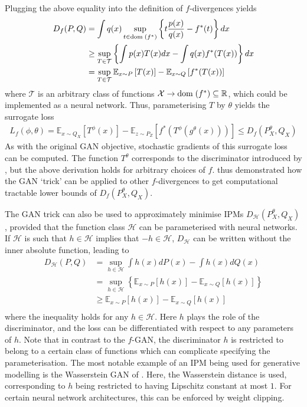 Plugging the above equality into the definition of $f$-divergences yields
%
\begin{align*}
D_f(P, Q) &= \int q(x) \sup_{t \in {\bf{\rm dom}}\;(f^*)} \left\{t \frac{p(x)}{q(x)} - f^*(t) \right\} dx \\
& \geq \sup_{T \in \mathcal{T}} \left\{ \int p(x) T(x) dx - \int q(x) f^*(T(x)) \right\} dx \\
&= \sup_{T \in \mathcal{T}} \mathbb{E}_{x \sim P} \left[ T(x) \right] - \mathbb{E}_{x \sim Q} \left[ f^*(T(x)) \right] 
\end{align*}
%
where $\mathcal{T}$ is an arbitrary class of functions $\mathcal{X} \to {\bf{\rm dom}}\;(f^*) \subseteq \mathbb{R}$, which could be implemented as a neural network.
Thus, parameterising $T$ by $\theta$ yields the surrogate loss
%
\begin{align*}
L_f(\phi, \theta) = \mathbb{E}_{x \sim Q_X} \left[ T^\phi(x) \right] - \mathbb{E}_{z \sim P_Z} \left[ f^*(T^\phi(g^\theta(x))) \right] \leq D_f(P^\theta_X, Q_X)
\end{align*}
%
As with the original GAN objective, stochastic gradients of this surrogate loss can be computed. 
The function $T^\theta$ corresponds to the discriminator introduced by \cite{goodfellow}, but the above derivation holds for arbitrary choices of $f$. 
\cite{nowozin et al} thus demonstrated how the GAN `trick' can be applied to other $f$-divergences to get computational tractable lower bounds of $D_f(P^\theta_X, Q_X)$.

The GAN trick can also be used to approximately minimise IPMs $D_\mathcal{H}(P^\theta_X, Q_X)$, provided that the function class $\mathcal{H}$ can be parameterised with neural networks.
If $\mathcal{H}$ is such that $h \in \mathcal{H}$ implies that $-h \in \mathcal{H}$, $D_\mathcal{H}$ can be written without the inner absolute function, leading to
%
\begin{align*}
D_{\mathcal{H}}(P, Q) &= \sup_{h\in\mathcal{H}} \int h(x) dP(x) - \int h(x) dQ(x) \\
&= \sup_{h\in\mathcal{H}} \left\{ \mathbb{E}_{x \sim P} \left[ h(x) \right]- \mathbb{E}_{x \sim Q} \left[ h(x) \right] \right\} \\
&\geq  \mathbb{E}_{x \sim P} \left[ h(x) \right]- \mathbb{E}_{x \sim Q} \left[ h(x) \right] \\
\end{align*}
%
where the inequality holds for any $h \in \mathcal{H}$. 
Here $h$ plays the role of the discriminator, and the loss can be differentiated with respect to any parameters of $h$.
Note that in contrast to the $f$-GAN, the discriminator $h$ is restricted to belong to a certain class of functions which can complicate specifying the parameterisation.
The most notable example of an IPM being used for generative modelling is the Wasserstein GAN of \cite{WGAN}. 
Here, the Wasserstein distance is used, corresponding to $h$ being restricted to having Lipschitz constant at most $1$. 
For certain neural network architectures, this can be enforced by weight clipping.


